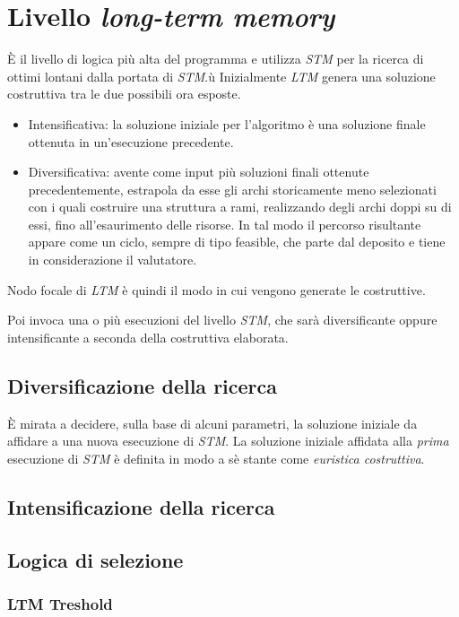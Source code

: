 \section{Livello \emph{long-term memory}}
È il livello di logica più alta del programma e utilizza \emph{STM} per la ricerca di ottimi lontani dalla portata di \emph{STM}.ù 
Inizialmente \emph{LTM} genera una soluzione costruttiva tra le due possibili ora esposte.
\begin{itemize}
\item Intensificativa: la soluzione iniziale per l'algoritmo è una soluzione finale ottenuta in un'esecuzione precedente. 
\item Diversificativa: avente come input più soluzioni finali ottenute precedentemente, estrapola da esse gli archi storicamente meno selezionati
  con i quali costruire una struttura a rami, realizzando degli archi doppi su di essi, fino all'esaurimento delle risorse. 
  In tal modo il percorso risultante appare come un ciclo, sempre di tipo feasible, che parte dal deposito e tiene in considerazione il valutatore.
\end{itemize}
Nodo focale di \emph{LTM} è quindi il modo in cui vengono generate le costruttive. 

Poi invoca una o più esecuzioni del livello \emph{STM}, che sarà diversificante oppure intensificante a seconda della costruttiva elaborata.

\subsection{Diversificazione della ricerca}
	È mirata a decidere, sulla base di alcuni parametri, la soluzione iniziale da affidare a una nuova esecuzione di \emph{STM}.
	La soluzione iniziale affidata alla \emph{prima} esecuzione di \emph{STM} è definita in modo a sè stante come \emph{euristica costruttiva}.
	
\subsection{Intensificazione della ricerca}


\subsection{Logica di selezione}
\label{subsec:ltmlogic}
	\subsubsection{LTM Treshold}	
	
